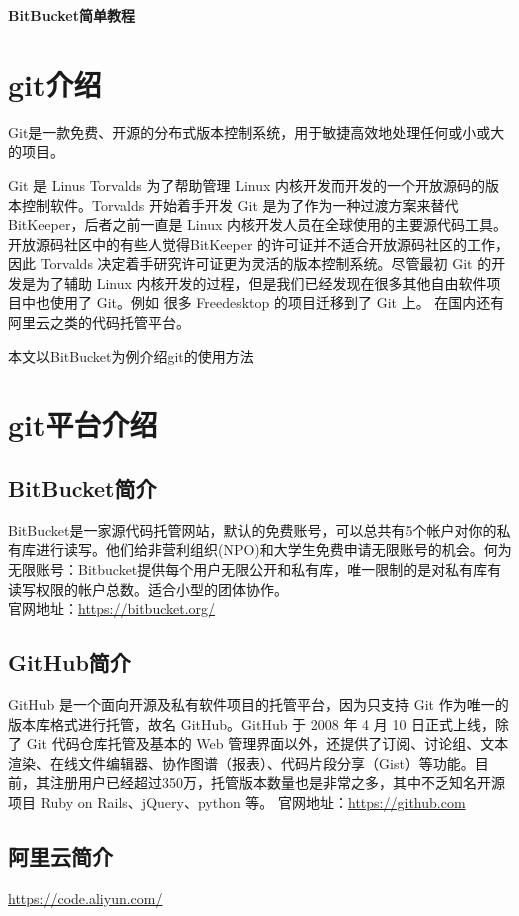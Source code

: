 \documentclass[a4paper,12pt]{ctexbook}
\begin{document}
\begin{center}
\huge \textbf{BitBucket简单教程}
\end{center}

\tableofcontents

\newpage

\chapter{git介绍}
Git是一款免费、开源的分布式版本控制系统，用于敏捷高效地处理任何或小或大的项目。

Git 是 Linus Torvalds 为了帮助管理 Linux 内核开发而开发的一个开放源码的版本控制软件。Torvalds 开始着手开发 Git 是为了作为一种过渡方案来替代 BitKeeper，后者之前一直是 Linux 内核开发人员在全球使用的主要源代码工具。开放源码社区中的有些人觉得BitKeeper 的许可证并不适合开放源码社区的工作，因此 Torvalds 决定着手研究许可证更为灵活的版本控制系统。尽管最初 Git 的开发是为了辅助 Linux 内核开发的过程，但是我们已经发现在很多其他自由软件项目中也使用了 Git。例如 很多 Freedesktop 的项目迁移到了 Git 上。
在国内还有阿里云之类的代码托管平台。

\textcolor[rgb]{0.00,1.00,0.25}{本文以BitBucket为例介绍git的使用方法}
\chapter{git平台介绍}
\section{BitBucket简介}
BitBucket是一家源代码托管网站，默认的免费账号，可以总共有5个帐户对你的私有库进行读写。他们给非营利组织(NPO)和大学生免费申请无限账号的机会。何为无限账号：Bitbucket提供每个用户无限公开和私有库，唯一限制的是对私有库有读写权限的帐户总数。适合小型的团体协作。\\
官网地址：\url{https://bitbucket.org/}
\section{GitHub简介}
GitHub 是一个面向开源及私有软件项目的托管平台，因为只支持 Git 作为唯一的版本库格式进行托管，故名 GitHub。GitHub 于 2008 年 4 月 10 日正式上线，除了 Git 代码仓库托管及基本的 Web 管理界面以外，还提供了订阅、讨论组、文本渲染、在线文件编辑器、协作图谱（报表）、代码片段分享（Gist）等功能。目前，其注册用户已经超过350万，托管版本数量也是非常之多，其中不乏知名开源项目 Ruby on Rails、jQuery、python 等。
官网地址：\url{https://github.com}
\section{阿里云简介}
\url{https://code.aliyun.com/}
\end{document}
